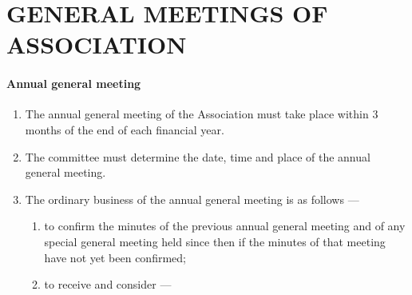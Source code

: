 \documentclass[../constitution.tex]{subfiles}
\begin{document}
\hypertarget{part-6-general-meetings-of-association}{%
  \part{GENERAL MEETINGS OF ASSOCIATION}\label{part-6-general-meetings-of-association}}

\hypertarget{annual-general-meeting}{%
  \subsection{Annual general meeting}\label{annual-general-meeting}}

\begin{enumerate}

  \item The annual general meeting of the Association must take place within 3 months of the end of each financial year.


  \item The committee must determine the date, time and place of the annual general meeting.
  \item The ordinary business of the annual general meeting is as follows ---

        \begin{enumerate}

          \item to confirm the minutes of the previous annual general meeting and of any special general meeting held since then if the minutes of that meeting have not yet been confirmed;
          \item to receive and consider ---

                \begin{enumerate}


\end{enumerate}
\end{enumerate}
\end{enumerate}
\end{document}
